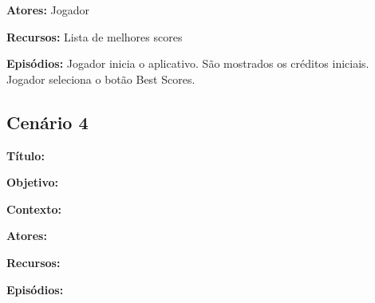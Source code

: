 \textbf{Atores:} Jogador

\textbf{Recursos:} Lista de melhores scores

\textbf{Episódios:} Jogador inicia o aplicativo. São mostrados os créditos iniciais. Jogador seleciona o botão Best Scores. 

\subsection{Cenário 4}

\textbf{Título:} 

\textbf{Objetivo:} 

\textbf{Contexto:} 

\textbf{Atores:} 

\textbf{Recursos:} 

\textbf{Episódios:} 

